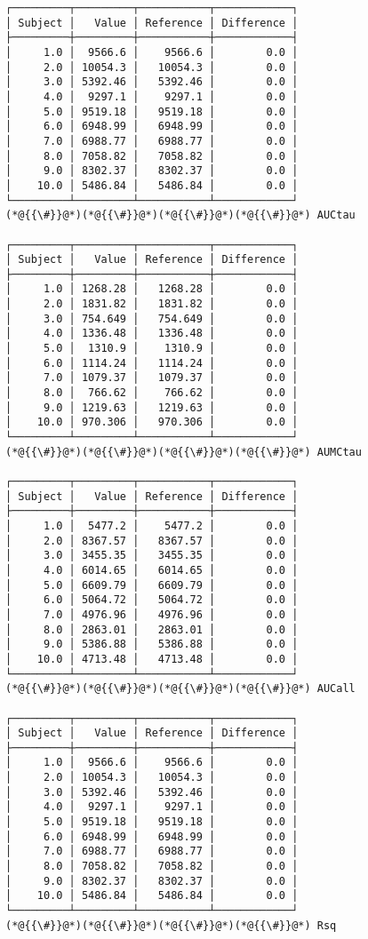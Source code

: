 \documentclass[12pt,a4paper]{article}
\begin{document}
\begin{lstlisting}
┌─────────┬─────────┬───────────┬────────────┐
│ Subject │   Value │ Reference │ Difference │
├─────────┼─────────┼───────────┼────────────┤
│     1.0 │  9566.6 │    9566.6 │        0.0 │
│     2.0 │ 10054.3 │   10054.3 │        0.0 │
│     3.0 │ 5392.46 │   5392.46 │        0.0 │
│     4.0 │  9297.1 │    9297.1 │        0.0 │
│     5.0 │ 9519.18 │   9519.18 │        0.0 │
│     6.0 │ 6948.99 │   6948.99 │        0.0 │
│     7.0 │ 6988.77 │   6988.77 │        0.0 │
│     8.0 │ 7058.82 │   7058.82 │        0.0 │
│     9.0 │ 8302.37 │   8302.37 │        0.0 │
│    10.0 │ 5486.84 │   5486.84 │        0.0 │
└─────────┴─────────┴───────────┴────────────┘
(*@{{\#}}@*)(*@{{\#}}@*)(*@{{\#}}@*)(*@{{\#}}@*) AUCtau

┌─────────┬─────────┬───────────┬────────────┐
│ Subject │   Value │ Reference │ Difference │
├─────────┼─────────┼───────────┼────────────┤
│     1.0 │ 1268.28 │   1268.28 │        0.0 │
│     2.0 │ 1831.82 │   1831.82 │        0.0 │
│     3.0 │ 754.649 │   754.649 │        0.0 │
│     4.0 │ 1336.48 │   1336.48 │        0.0 │
│     5.0 │  1310.9 │    1310.9 │        0.0 │
│     6.0 │ 1114.24 │   1114.24 │        0.0 │
│     7.0 │ 1079.37 │   1079.37 │        0.0 │
│     8.0 │  766.62 │    766.62 │        0.0 │
│     9.0 │ 1219.63 │   1219.63 │        0.0 │
│    10.0 │ 970.306 │   970.306 │        0.0 │
└─────────┴─────────┴───────────┴────────────┘
(*@{{\#}}@*)(*@{{\#}}@*)(*@{{\#}}@*)(*@{{\#}}@*) AUMCtau

┌─────────┬─────────┬───────────┬────────────┐
│ Subject │   Value │ Reference │ Difference │
├─────────┼─────────┼───────────┼────────────┤
│     1.0 │  5477.2 │    5477.2 │        0.0 │
│     2.0 │ 8367.57 │   8367.57 │        0.0 │
│     3.0 │ 3455.35 │   3455.35 │        0.0 │
│     4.0 │ 6014.65 │   6014.65 │        0.0 │
│     5.0 │ 6609.79 │   6609.79 │        0.0 │
│     6.0 │ 5064.72 │   5064.72 │        0.0 │
│     7.0 │ 4976.96 │   4976.96 │        0.0 │
│     8.0 │ 2863.01 │   2863.01 │        0.0 │
│     9.0 │ 5386.88 │   5386.88 │        0.0 │
│    10.0 │ 4713.48 │   4713.48 │        0.0 │
└─────────┴─────────┴───────────┴────────────┘
(*@{{\#}}@*)(*@{{\#}}@*)(*@{{\#}}@*)(*@{{\#}}@*) AUCall

┌─────────┬─────────┬───────────┬────────────┐
│ Subject │   Value │ Reference │ Difference │
├─────────┼─────────┼───────────┼────────────┤
│     1.0 │  9566.6 │    9566.6 │        0.0 │
│     2.0 │ 10054.3 │   10054.3 │        0.0 │
│     3.0 │ 5392.46 │   5392.46 │        0.0 │
│     4.0 │  9297.1 │    9297.1 │        0.0 │
│     5.0 │ 9519.18 │   9519.18 │        0.0 │
│     6.0 │ 6948.99 │   6948.99 │        0.0 │
│     7.0 │ 6988.77 │   6988.77 │        0.0 │
│     8.0 │ 7058.82 │   7058.82 │        0.0 │
│     9.0 │ 8302.37 │   8302.37 │        0.0 │
│    10.0 │ 5486.84 │   5486.84 │        0.0 │
└─────────┴─────────┴───────────┴────────────┘
(*@{{\#}}@*)(*@{{\#}}@*)(*@{{\#}}@*)(*@{{\#}}@*) Rsq


\end{lstlisting}
\end{document}
